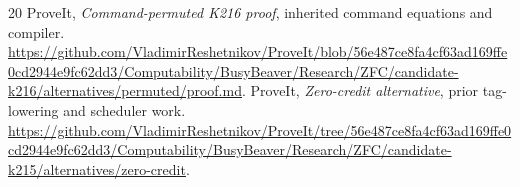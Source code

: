 \documentclass[11pt]{article}
\begin{document}
\begin{thebibliography}{20}
 ProveIt, \emph{Command-permuted K216 proof}, inherited command equations and compiler. \url{https://github.com/VladimirReshetnikov/ProveIt/blob/56e487ce8fa4cf63ad169ffe0cd2944e9fc62dd3/Computability/BusyBeaver/Research/ZFC/candidate-k216/alternatives/permuted/proof.md}.
 ProveIt, \emph{Zero-credit alternative}, prior tag-lowering and scheduler work. \url{https://github.com/VladimirReshetnikov/ProveIt/tree/56e487ce8fa4cf63ad169ffe0cd2944e9fc62dd3/Computability/BusyBeaver/Research/ZFC/candidate-k215/alternatives/zero-credit}.
\end{thebibliography}
\end{document}
